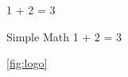 \newpage
{}

\begin{Th}{}
	1 + 2 = 3
\end{Th}
\begin{Th}{Simple Math}
	1 + 2 = 3
\end{Th}

\ref{fig:logo}

